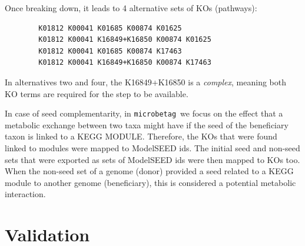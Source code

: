 \documentclass[sn-mathphys,Numbered]{sn-jnl}  %
\theoremstyle{thmstyleone}%
\theoremstyle{thmstyletwo}%
\theoremstyle{thmstylethree}%
\newcommand{\microbetag}{\texttt{microbetag}}
\begin{document}
\begin{appendices}
        Once breaking down, it leads to 4 alternative sets of KOs (pathways):

        \bigskip
        \begin{verbatim}
        K01812 K00041 K01685 K00874 K01625
        K01812 K00041 K16849+K16850 K00874 K01625
        K01812 K00041 K01685 K00874 K17463
        K01812 K00041 K16849+K16850 K00874 K17463
        \end{verbatim}
        \bigskip

        In alternatives two and four, the K16849+K16850 is a \textit{complex}, meaning both KO terms are required for the step to be available.

        In case of seed complementarity, in \microbetag~we focus on the effect that a metabolic exchange between two taxa might have if the seed of the beneficiary taxon is linked to a KEGG MODULE.
        Therefore, the KOs that were found linked to modules were mapped to ModelSEED ids. 
        The initial seed and non-seed sets that were exported as sets of ModelSEED ids were then mapped to KOs too.
        When the non-seed set of a genome (donor) provided a seed related to a KEGG module to another genome (beneficiary), this is considered a potential metabolic interaction.


    \clearpage
    \section{Validation}
    \label{app:val}


\end{appendices}
\end{document}
